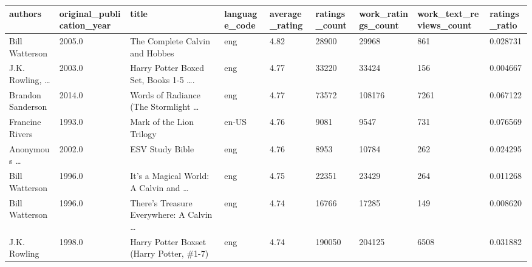 \documentclass[handout]{beamer}
\begin{document}
\begin{frame}
 

\begin{table}
\begin{tabular}{lHlHHHHHZ}
\toprule
                                    authors &  original\_publication\_year &                                              title & language\_code &  average\_rating &  ratings\_count &  work\_ratings\_count &  work\_text\_reviews\_count &  ratings\_ratio \\
\midrule
                             Bill Watterson &                     2005.0 &                     The Complete Calvin and Hobbes &           eng &            4.82 &          28900 &               29968 &                      861 &       0.028731 \\
                J.K. Rowling, \ldots &                     2003.0 &  Harry Potter Boxed Set, Books 1-5 \ldots. &           eng &            4.77 &          33220 &               33424 &                      156 &       0.004667 \\
                          Brandon Sanderson &                     2014.0 &     Words of Radiance (The Stormlight \ldots &           eng &            4.77 &          73572 &              108176 &                     7261 &       0.067122 \\
                            Francine Rivers &                     1993.0 &                           Mark of the Lion Trilogy &         en-US &            4.76 &           9081 &                9547 &                      731 &       0.076569 \\
 Anonymous \ldots &                     2002.0 &                                    ESV Study Bible &           eng &            4.76 &           8953 &               10784 &                      262 &       0.024295 \\
                             Bill Watterson &                     1996.0 &  It's a Magical World: A Calvin and \ldots &           eng &            4.75 &          22351 &               23429 &                      264 &       0.011268 \\
                             Bill Watterson &                     1996.0 &  There's Treasure Everywhere: A Calvin \ldots &           eng &            4.74 &          16766 &               17285 &                      149 &       0.008620 \\
                               J.K. Rowling &                     1998.0 &           Harry Potter Boxset (Harry Potter, \#1-7) &           eng &            4.74 &         190050 &              204125 &                     6508 &       0.031882 \\

\end{tabular}
\end{table}
\end{frame}
\end{document}
